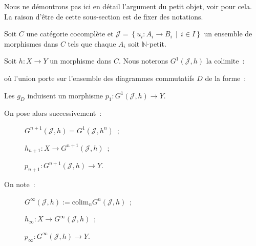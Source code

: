 \documentclass{amsart}
\theoremstyle{plain}
\theoremstyle{definition}
\theoremstyle{remark}
\newcommand{\ensemblenombre }[1]{\mathbb{#1}}
\newcommand{\N}{\ensemblenombre{N}}
\newcommand{\colim}{\mathrm{colim}}
\newcommand{\ra}{\rightarrow}
\newcommand{\enstq}[2]{\left\{#1\,\middle|\,#2\right\}}
\begin{document}
Nous ne démontrons pas ici en détail l'argument du petit objet, voir \cite[Chp.1]{Goer} pour cela.
La raison d'être de cette sous-section est de fixer des notations.

Soit $C$ une catégorie cocomplète et $\mathcal{J}=\enstq{u_i:A_i\ra B_i}{i\in I}$ un ensemble de morphismes dans $C$ tels que
chaque $A_i$ soit $\N$-petit.

Soit $h:X\ra Y$ un morphisme dans $C$. Nous noterons $G^1(\mathcal{J},h)$ la colimite~:
\begin{center}
\end{center}
où l'union porte sur l'ensemble des diagrammes commutatifs $D$ de la forme~:
\begin{center}
\end{center}
Les $g_D$ induisent un morphisme $p_1:G^1(\mathcal{J},h)\ra Y$.

On pose alors successivement~:
\begin{description}
  \item[] $G^{n+1}(\mathcal{J},h)=G^1(\mathcal{J},h^n)$~;
  \item[] $h_{n+1}: X\ra G^{n+1}(\mathcal{J},h)$~;
  \item[] $p_{n+1}:G^{n+1}(\mathcal{J},h)\ra Y$.
\end{description}
On note~:
\begin{description}
  \item[] $G^{\infty}(\mathcal{J},h):=\colim_n G^n(\mathcal{J},h)$~;
  \item[] $h_\infty:X\ra G^{\infty}(\mathcal{J},h)$~;
  \item[] $p_\infty:G^{\infty}(\mathcal{J},h)\ra Y$.
\end{description}
\end{document}
